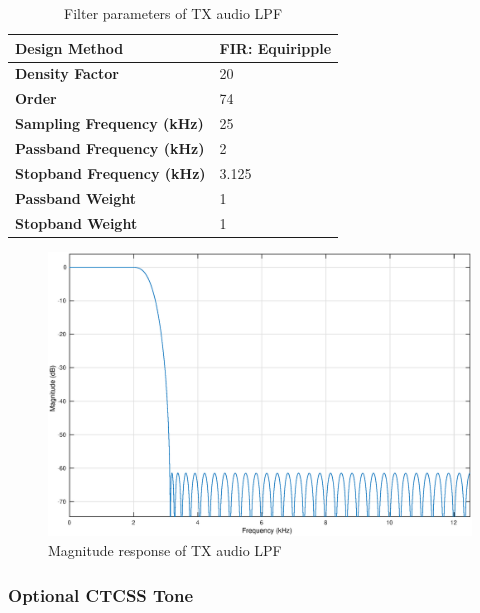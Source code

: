 \begin{table}[h]
  \centering
  \caption{Filter parameters of TX audio LPF}
  \label{tab:filt_tx_audio}
  \footnotesize
  \begin{tabular} {|l|l|}
    \hline
    \textbf{Design Method}              & FIR: Equiripple \\ \hline
    \textbf{Density Factor}             & 20              \\ \hline
    \textbf{Order}                      & 74              \\ \hline
    \textbf{Sampling Frequency (kHz)}   & 25              \\ \hline
    \textbf{Passband Frequency (kHz)}   & 2               \\ \hline
    \textbf{Stopband Frequency (kHz)}   & 3.125           \\ \hline
    \textbf{Passband Weight}            & 1               \\ \hline
    \textbf{Stopband Weight}            & 1               \\ \hline
  \end{tabular}
\end{table}

\begin{figure}[h!]
  \centering
  \includegraphics[width=5in]{images/frs/filter/tx/audio-fir.eps}
  \caption{Magnitude response of TX audio LPF}
  \label{fig:filtresp_tx_audio}
\end{figure}

\subsubsection{Optional CTCSS Tone}

